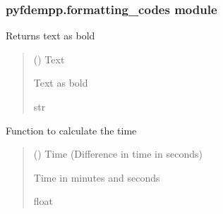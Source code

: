 \documentclass[letterpaper,10pt,english]{sphinxmanual}
\begin{document}
\subsubsection{pyfdempp.formatting\_codes module}
\label{\detokenize{pyfdempp:module-pyfdempp.formatting_codes}}\label{\detokenize{pyfdempp:pyfdempp-formatting-codes-module}}

\begin{fulllineitems}
\label{\detokenize{pyfdempp:pyfdempp.formatting_codes.bold_text}}
\pysigstartsignatures
{}
\pysigstopsignatures
\sphinxAtStartPar
Returns text as bold
\begin{quote}\begin{description}
\sphinxAtStartPar
{} () \textendash{} Text

\sphinxAtStartPar
Text as bold

\sphinxAtStartPar
str

\end{description}\end{quote}

\end{fulllineitems}


\begin{fulllineitems}
\label{\detokenize{pyfdempp:pyfdempp.formatting_codes.calc_timer_values}}
\pysigstartsignatures
{}
\pysigstopsignatures
\sphinxAtStartPar
Function to calculate the time
\begin{quote}\begin{description}
\sphinxAtStartPar
{} () \textendash{} Time (Difference in time in seconds)

\sphinxAtStartPar
Time in minutes and seconds

\sphinxAtStartPar
float

\end{description}\end{quote}

\end{fulllineitems}
\end{document}
